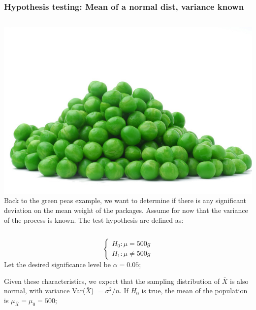 \documentclass[10pt]{beamer}
\begin{document}
\begin{frame}
  \frametitle{Hypothesis testing: Mean of a normal dist, variance known}
  \begin{columns}
    \includegraphics[width=1\textwidth]{img/peas}
     Back to the green peas example, we want to
    determine if there is any significant deviation on the mean weight
    of the packages. Assume for now that the variance of the process
    is known. The test hypothesis are defined as:
  \end{columns}
  
  \bigskip

  \begin{equation*}
    \begin{cases}
      H_0 : \mu = 500g\\
      H_1 : \mu \neq 500g
    \end{cases}
  \end{equation*}
  Let the desired significance level be $\alpha = 0.05$;

  \bigskip

  Given these characteristics, we expect that the sampling
  distribution of $\bar{X}$ is also normal, with variance
  Var($\bar{X}$) $= \sigma^2/n$. If $H_0$ is true, the mean of the
  population is $\mu_{\bar{X}} = \mu_0 = 500$;
\end{frame}
\end{document}
